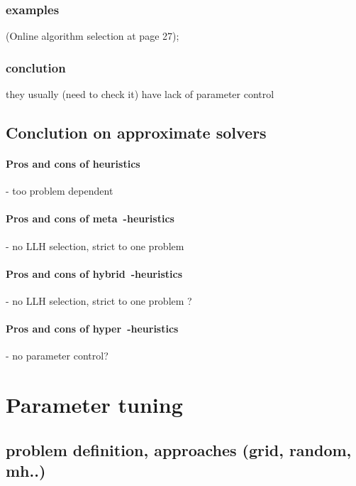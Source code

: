 \subsubsection{examples}%
\cite{surv:drake2019recent} (Online algorithm selection at page 27); \cite{surv:kerschke2019automated}
\subsubsection{conclution} they usually (need to check it) have lack of parameter control

\subsection{Conclution on approximate solvers}
\paragraph{Pros and cons of heuristics} - too problem dependent
\paragraph{Pros and cons of meta~-heuristics} - no LLH selection, strict to one problem
\paragraph{Pros and cons of hybrid~-heuristics} - no LLH selection, strict to one problem ? 
\paragraph{Pros and cons of hyper~-heuristics} - no parameter control?


\section{Parameter tuning}

\subsection{problem definition, approaches (grid, random, mh..)}

